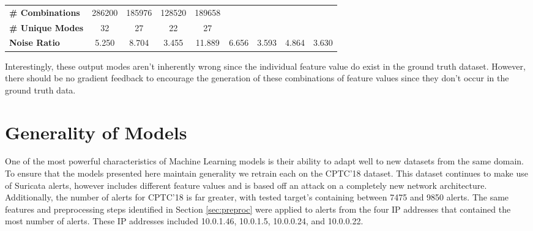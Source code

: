 \begin{table}[!htbp]
\begin{adjustbox}{angle=90}
\begin{tabular}{c|c|c|c|c|c|c|c|c}
			\multicolumn{1}{l|}{\textbf{\# Combinations}} & \multicolumn{1}{c|}{286200} & \multicolumn{1}{c|}{185976} & \multicolumn{1}{c|}{128520} & \multicolumn{1}{c|}{189658} & \multicolumn{1}{l|}{} & \multicolumn{1}{l|}{} & \multicolumn{1}{l|}{} & \multicolumn{1}{l}{} \\
			\multicolumn{1}{l|}{\textbf{\# Unique Modes}} & \multicolumn{1}{c|}{32} & \multicolumn{1}{c|}{27} & \multicolumn{1}{c|}{22} & \multicolumn{1}{c|}{27} & \multicolumn{1}{l|}{} & \multicolumn{1}{l|}{} & \multicolumn{1}{l|}{} & \multicolumn{1}{l}{} \\
			\multicolumn{1}{l|}{\textbf{Noise Ratio}} & 5.250 & 8.704 & 3.455 & 11.889 & 6.656 & 3.593 & 4.864 & 3.630
		\end{tabular}
	\end{adjustbox}
\end{table}

Interestingly, these output modes aren't inherently wrong since the individual feature value do exist in the ground truth dataset. However, there should be no gradient feedback to encourage the generation of these combinations of feature values since they don't occur in the ground truth data.

\section{Generality of Models}
\label{sec:cptc18}

One of the most powerful characteristics of Machine Learning models is their ability to adapt well to new datasets from the same domain. To ensure that the models presented here maintain generality we retrain each on the CPTC'18 dataset. This dataset continues to make use of Suricata alerts, however includes different feature values and is based off an attack on a completely new network architecture. Additionally, the number of alerts for CPTC'18 is far greater, with tested target's containing between 7475 and 9850 alerts. The same features and preprocessing steps identified in Section \ref{sec:preproc} were applied to alerts from the four IP addresses that contained the most number of alerts. These IP addresses included 10.0.1.46, 10.0.1.5, 10.0.0.24, and 10.0.0.22.

